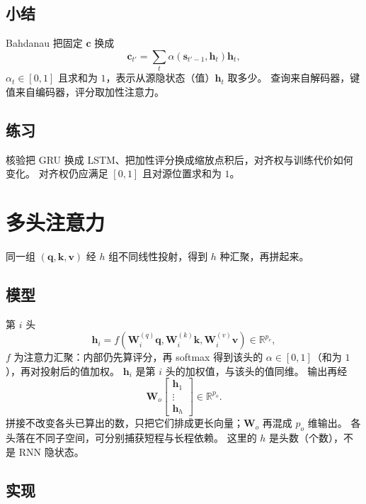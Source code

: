 \subsection{小结}

Bahdanau 把固定 $\bm{c}$ 换成
\[
\bm{c}_{t'}=\sum_{t}\alpha(\bm{s}_{t'-1},\bm{h}_t)\bm{h}_t,
\]
$\alpha_t\in[0,1]$ 且求和为 $1$，表示从源隐状态（值）$\bm{h}_t$ 取多少。
查询来自解码器，键值来自编码器，评分取加性注意力。

\subsection{练习}

核验把 GRU 换成 LSTM、把加性评分换成缩放点积后，对齐权与训练代价如何变化。
对齐权仍应满足 $[0,1]$ 且对源位置求和为 $1$。

\section{多头注意力}



同一组 $(\bm{q},\bm{k},\bm{v})$ 经 $h$ 组不同线性投射，得到 $h$ 种汇聚，再拼起来。

\subsection{模型}

第 $i$ 头
\[
\bm{h}_i
=
f(\bm{W}_{i}^{(q)}\bm{q},\bm{W}_{i}^{(k)}\bm{k},\bm{W}_{i}^{(v)}\bm{v})
\in\mathbb{R}^{p_{v}},
\]
$f$ 为注意力汇聚：内部仍先算评分，再 softmax 得到该头的 $\alpha\in[0,1]$（和为 $1$），再对投射后的值加权。
$\bm{h}_i$ 是第 $i$ 头的加权值，与该头的值同维。
输出再经
\[
\bm{W}_{o}
\begin{bmatrix}
\bm{h}_1\\
\vdots\\
\bm{h}_{h}
\end{bmatrix}
\in\mathbb{R}^{p_{o}}.
\]
拼接不改变各头已算出的数，只把它们排成更长向量；$\bm{W}_o$ 再混成 $p_o$ 维输出。
各头落在不同子空间，可分别捕获短程与长程依赖。
这里的 $h$ 是头数（个数），不是 RNN 隐状态。

\subsection{实现}

